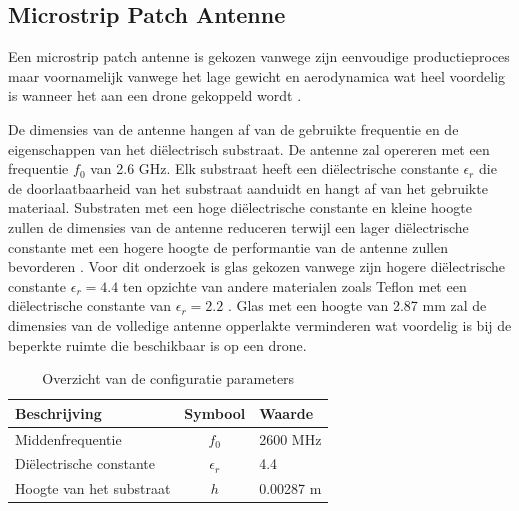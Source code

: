 \documentclass[twocolumn]{phdsymp_dutch}
\begin{document}
\subsection{Microstrip Patch Antenne}
Een microstrip patch antenne is gekozen vanwege zijn eenvoudige productieproces maar voornamelijk vanwege het
 lage gewicht en aerodynamica wat heel voordelig is wanneer het aan een drone gekoppeld wordt \cite{J13_microstripadvantages}.

De dimensies van de antenne hangen af van de gebruikte frequentie en de eigenschappen van het di\"electrisch substraat.
De antenne zal opereren met een frequentie $f_0$ van 2.6 GHz. 
Elk substraat heeft een di\"electrische constante $\epsilon_r$ die de doorlaatbaarheid 
van het substraat aanduidt en hangt af van het gebruikte materiaal.
Substraten met een hoge di\"electrische constante en kleine hoogte zullen de dimensies van de antenne reduceren 
terwijl  een lager di\"electrische constante met een hogere hoogte de performantie van de 
antenne zullen bevorderen \cite{J14_antennadesign,J15_antennadesign}. 
Voor dit onderzoek is glas gekozen vanwege zijn hogere di\"electrische constante
 $\epsilon_r = 4.4$ ten opzichte van andere materialen zoals Teflon met een di\"electrische constante
van $\epsilon_r = 2.2$ \cite{J14_antennadesign}. 
Glas met een hoogte van 2.87 mm 
zal de dimensies van de volledige antenne opperlakte verminderen wat 
voordelig is bij de beperkte ruimte die beschikbaar is op een drone.

\begin{table}[h!]
\centering
\begin{tabular}{|l|c|l|}
\hline
 Beschrijving            & Symbool          & Waarde         \\    \hline
 Middenfrequentie      & $f_0$           & 2600 MHz       \\ 
 Di\"electrische constante    & $\epsilon_r$    & 4.4         \\ 
 Hoogte van het substraat & $h$             & 0.00287 m    \\ \hline
\end{tabular}
\caption{Overzicht van de configuratie parameters}
\label{table:antennaparas}
\end{table}
\end{document}
